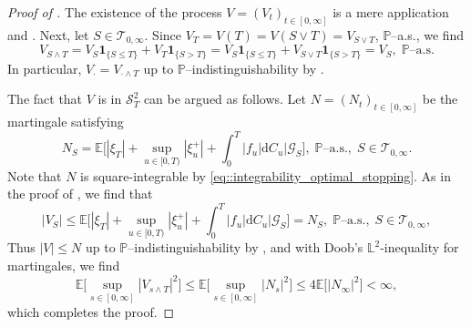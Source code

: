 \documentclass[10pt]{article} %
\newcommand\cG{\mathcal G}
\newcommand\cS{\mathcal S}
\newcommand\cT{\mathcal T}
\def \E{\mathbb{E}}
\def \L{\mathbb{L}}
\def \P{\mathbb{P}}
\def\d{\mathrm{d}}
\begin{document}
\begin{proof}[Proof of ]
	The existence of the process $V = (V_t)_{t \in [0,\infty]}$ is a mere application  and \cite[Appendix I, Remark 23(b)]{dellacherie1982probabilities}. Next, let $S \in \cT_{0,\infty}$. Since $V_{T} = V(T) = V(S \lor T) = V_{S \lor T}$, $\P$--a.s., we find
	\begin{equation*}
		V_{S \land T} = V_S \mathbf{1}_{\{S \leq T\}} + V_T \mathbf{1}_{\{S > T\}} = V_S\mathbf{1}_{\{S \leq T\}} + V_{S \lor T}\mathbf{1}_{\{S > T\}} = V_S, \; \text{$\P$--a.s.}
	\end{equation*}
	In particular, $V_\cdot = V_{\cdot \land T}$ up to $\P$--indistinguishability by .
	
	\medskip
	The fact that $V$ is in $\cS^2_T$ can be argued as follows. Let $N = (N_t)_{t \in [0,\infty]}$ be the martingale satisfying
	\begin{equation*}
		N_S = \E\Bigg[|\xi_T| + \sup_{u \in [0,T)}|\xi^+_u| + \int_0^T|f_u|\d C_u \bigg| \cG_S\bigg], \; \text{$\P$--a.s.}, \; S \in \cT_{0,\infty}.
	\end{equation*} 
	Note that $N$ is square-integrable by \eqref{eq::integrability_optimal_stopping}. As in the proof of , we find that
	\begin{equation*}
		|V_S| \leq \E\Bigg[|\xi_T| + \sup_{u \in [0,T)}|\xi^+_u| + \int_0^T|f_u|\d C_u \bigg| \cG_S\bigg] = N_S,\; \text{$\P$--a.s.}, \; S \in \cT_{0,\infty},
	\end{equation*}
	Thus $|V| \leq N$ up to $\P$--indistinguishability by , and with Doob's $\L^2$-inequality for martingales, we find
	\begin{equation*}
		\E\bigg[\sup_{s \in [0,\infty]} |V_{s \land T}|^2\bigg] \leq \E\bigg[\sup_{s \in [0,\infty]} |N_s|^2\bigg] \leq 4 \E\big[|N_\infty|^2\big] < \infty,
	\end{equation*}
	which completes the proof.
\end{proof}
\end{document}
